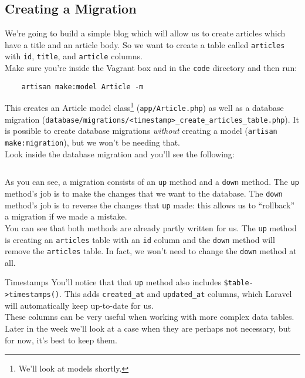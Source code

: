 \subsection{Creating a Migration}

We're going to build a simple blog which will allow us to create articles which have a title and an article body. So we want to create a table called \texttt{articles} with \texttt{id}, \texttt{title}, and \texttt{article} columns.
\\

Make sure you're inside the Vagrant box and in the \texttt{code} directory and then run:

\begin{verbatim}
    artisan make:model Article -m
\end{verbatim}

This creates an Article model class\footnote{We'll look at models shortly.} (\texttt{app/Article.php}) as well as a database migration (\texttt{database/migrations/<timestamp>\_create\_articles\_table.php}). It is possible to create database migrations \textit{without} creating a model (\texttt{artisan make:migration}), but we won't be needing that.
\\

Look inside the database migration and you'll see the following:

\inputminted{php}{02/figures/02/01-migration.php}

As you can see, a migration consists of an \texttt{up} method and a \texttt{down} method. The \texttt{up} method's job is to make the changes that we want to the database. The \texttt{down} method's job is to reverse the changes that \texttt{up} made: this allows us to ``rollback'' a migration if we made a mistake.
\\

You can see that both methods are already partly written for us. The \texttt{up} method is creating an \texttt{articles} table with an \texttt{id} column and the \texttt{down} method will remove the \texttt{articles} table. In fact, we won't need to change the \texttt{down} method at all.

\begin{infobox}{Timestamps}
    You'll notice that that \texttt{up} method also includes \texttt{\$table->timestamps()}. This adds \texttt{created\_at} and \texttt{updated\_at} columns, which Laravel will automatically keep up-to-date for us.
    \\

    These columns can be very useful when working with more complex data tables. Later in the week we'll look at a case when they are perhaps not necessary, but for now, it's best to keep them.
\end{infobox}

